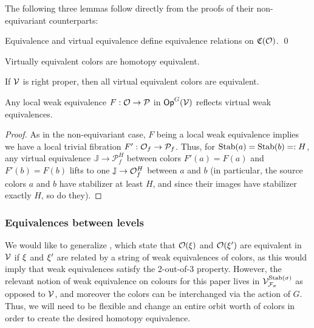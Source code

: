 \documentclass[psamsfonts,oneside,10pt,letterpaper
,draft
]{amsart}%
\renewcommand{\C}{\ensuremath{\mathfrak{C}}}
\renewcommand{\F}{\mathcal F}
\newcommand{\J}{\ensuremath{\mathbb{J}}}
\renewcommand{\1}{\ensuremath{\mathbb{id}}}
\renewcommand{\P}{\ensuremath{\mathcal{P}}}
\newcommand{\Vsigma}{\ensuremath{\V^{\Stab(\sigma)}_{\F_\sigma}}}
\begin{document}
The following three lemmas follow directly from the proofs of their non-equivariant counterparts:
\begin{lemma}
      Equivalence and virtual equivalence define equivalence relations on $\C(\O)$. \qed
\end{lemma}
\begin{lemma}
      Virtually equivalent colors are homotopy equivalent. 
\end{lemma}
\begin{lemma}
      \label{RIGHTPROPER_LEM}
      If $\mathcal V$ is right proper, then all virtual equivalent colors are equivalent. 
\end{lemma}

\begin{lemma}
      Any local weak equivalence $F: \O\to \P$ in $\mathsf{Op}^G(\mathcal V)$ reflects virtual weak equivalences.
\end{lemma}
\begin{proof}
      As in the non-equivariant case, $F$ being a local weak equivalence implies
      we have a local trivial fibration $F': \O_f\to \P_f$.
      Thus, for $\mathrm{Stab}(a) = \mathrm{Stab}(b) =: H$, any virtual equivalence $\J \to \P_f^H$ between colors
      $F'(a) = F(a)$ and $F'(b) = F(b)$
      lifts to one $\J \to \O_f^H$ between $a$ and $b$
      (in particular,
      the source colors $a$ and $b$ have stabilizer at least $H$, and since their images have stabilizer exactly $H$, so do they). 
\end{proof}

\subsubsection{Equivalences between levels}

We would like to generalize \cite[4.14 and 4.15]{Cav14}, which state that
$\mathcal{O}(\xi)$ and $\mathcal{O}(\xi')$ are equivalent in $\mathcal V$ if $\xi$ and $\xi'$ are related by a string of weak equivalences of colors,
as this would imply that weak equivalences satisfy the 2-out-of-3 property.
However, the relevant notion of weak equivalence on colours for this paper lives in $\Vsigma$ as opposed to $\mathcal V$,
and moreover the colors can be interchanged via the action of $G$.
Thus, we will need to be flexible and change an entire orbit worth of colors in order to create the desired homotopy equivalence. 
\end{document}
